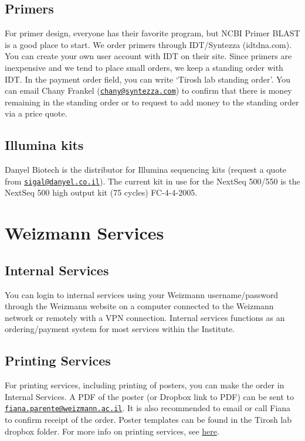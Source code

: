 \documentclass[]{book}
\begin{document}
\section{Primers}\label{primers}

For primer design, everyone has their favorite program, but NCBI Primer
BLAST is a good place to start. We order primers through IDT/Syntezza
(idtdna.com). You can create your own user account with IDT on their
site. Since primers are inexpensive and we tend to place small orders,
we keep a standing order with IDT. In the payment order field, you can
write `Tirosh lab standing order'. You can email Chany Frankel
(\href{mailto:chany@syntezza.com}{\nolinkurl{chany@syntezza.com}}) to
confirm that there is money remaining in the standing order or to
request to add money to the standing order via a price quote.

\section{Illumina kits}\label{illumina-kits}

Danyel Biotech is the distributor for Illumina sequencing kits (request
a quote from
\href{mailto:sigal@danyel.co.il}{\nolinkurl{sigal@danyel.co.il}}). The
current kit in use for the NextSeq 500/550 is the NextSeq 500 high
output kit (75 cycles) FC-4-4-2005.

\chapter{Weizmann Services}\label{wisServices}

\section{Internal Services}\label{internal-services}

You can login to internal services using your Weizmann username/password
through the Weizmann website on a computer connected to the Weizmann
network or remotely with a VPN connection. Internal services functions
as an ordering/payment system for most services within the Institute.

\section{Printing Services}\label{printing-services}

For printing services, including printing of posters, you can make the
order in Internal Services. A PDF of the poster (or Dropbox link to PDF)
can be sent to
\href{mailto:fiana.parente@weizmann.ac.il}{\nolinkurl{fiana.parente@weizmann.ac.il}}.
It is also recommended to email or call Fiana to confirm receipt of the
order. Poster templates can be found in the Tirosh lab dropbox folder.
For more info on printing services, see
\href{https://www.weizmann.ac.il/RSD/units/design-photography-printing-branch/overview}{here}.
\end{document}
